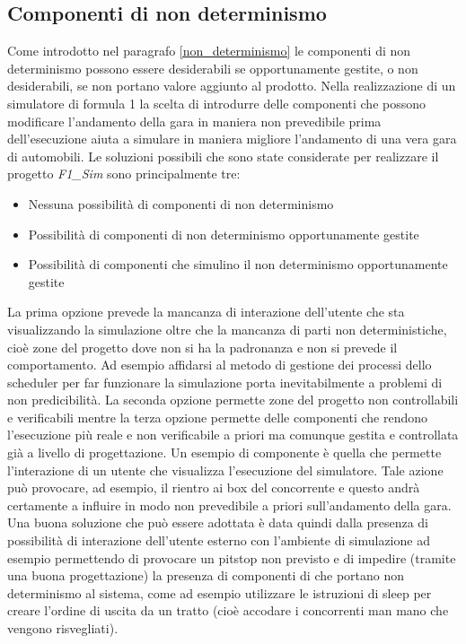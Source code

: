 \subsection{Componenti di non determinismo }
\label{componenti_non_determinismo}
Come introdotto nel paragrafo \ref{non_determinismo} le componenti di non
determinismo possono essere desiderabili se opportunamente gestite, o non
desiderabili, se non portano valore aggiunto al prodotto. Nella realizzazione di
un simulatore di formula 1 la scelta di introdurre delle componenti che possono
modificare l'andamento della gara in maniera non prevedibile prima
dell'esecuzione aiuta a simulare in maniera migliore l'andamento di una vera
gara di automobili. Le soluzioni possibili che sono state considerate per
realizzare il progetto \emph{F1\_Sim} sono principalmente tre:
\begin{itemize}
\item Nessuna possibilit\`{a} di componenti di non determinismo
\item Possibilit\`{a} di componenti di non determinismo opportunamente gestite
\item Possibilit\`{a} di componenti che simulino il non determinismo
opportunamente gestite
\end{itemize}
La prima opzione prevede la mancanza di interazione dell'utente che sta
visualizzando la simulazione oltre che la mancanza di parti non deterministiche,
cioè zone del progetto dove non si ha la padronanza e non si prevede il
comportamento. Ad esempio affidarsi al metodo di gestione dei processi dello scheduler per far funzionare la
simulazione porta inevitabilmente a problemi di non predicibilità. La
seconda opzione permette zone del progetto non controllabili e verificabili
mentre la terza opzione permette delle componenti che rendono l'esecuzione
più reale e non verificabile a priori ma comunque gestita e controllata
già a livello di progettazione. Un esempio di componente è quella che
permette l'interazione di un utente che visualizza l'esecuzione del simulatore.
Tale azione pu\`{o} provocare, ad esempio, il rientro ai box del concorrente e
questo andr\`{a} certamente a influire in modo non prevedibile a priori
sull'andamento della gara.\\
Una buona soluzione che pu\`{o} essere adottata è data quindi dalla presenza di
possibilit\`{a} di interazione dell'utente esterno con l'ambiente di simulazione
ad esempio permettendo di provocare un pitstop non previsto e di impedire
(tramite una buona progettazione) la presenza di componenti di che portano non
determinismo al sistema, come ad esempio utilizzare le istruzioni di sleep per
creare l'ordine di uscita da un tratto (cioè accodare i concorrenti man mano che
vengono risvegliati).
